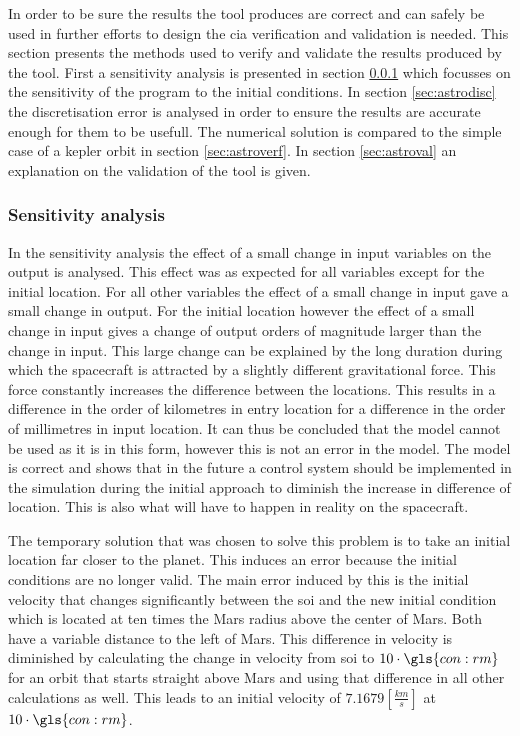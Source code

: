 In order to be sure the results the tool produces are correct and can safely be used in further efforts to design the \gls{cia} verification and validation is needed. This section presents the methods used to verify and validate the results produced by the tool. First a sensitivity analysis is presented in section \ref{sec:astrosens} which focusses on the sensitivity of the program to the initial conditions. In section \ref{sec:astrodisc} the discretisation error is analysed in order to ensure the results are accurate enough for them to be usefull. The numerical solution is compared to the simple case of a kepler orbit in section \ref{sec:astroverf}. In section \ref{sec:astroval} an explanation on the validation of the tool is given.

\subsubsection{Sensitivity analysis}
\label{sec:astrosens}

In the sensitivity analysis the effect of a small change in input variables on the output is analysed. This effect was as expected for all variables except for the initial location. For all other variables the effect of a small change in input gave a small change in output. For the initial location however the effect of a small change in input gives a change of output orders of magnitude larger than the change in input. This large change can be explained by the long duration during which the spacecraft is attracted by a slightly different gravitational force. This force constantly increases the difference between the locations. This results in a difference in the order of kilometres in entry location for a difference in the order of millimetres in input location. It can thus be concluded that the model cannot be used as it is in this form, however this is not an error in the model. The model is correct and shows that in the future a control system should be implemented in the simulation during the initial approach to diminish the increase in difference of location. This is also what will have to happen in reality on the spacecraft.

The temporary solution that was chosen to solve this problem is to take an initial location far closer to the planet. This induces an error because the initial conditions are no longer valid. The main error induced by this is the initial velocity that changes significantly between the \gls{soi} and the new initial condition which is located at ten times the Mars radius above the center of Mars. Both have a variable distance to the left of Mars. This difference in velocity is diminished by calculating the change in velocity from \gls{soi} to $10\cdot\gls{con:rm}$ for an orbit that starts straight above Mars and using that difference in all other calculations as well. This leads to an initial velocity of $7.1679 \left[\frac{km}{s}\right]$ at $10\cdot\gls{con:rm}$.


